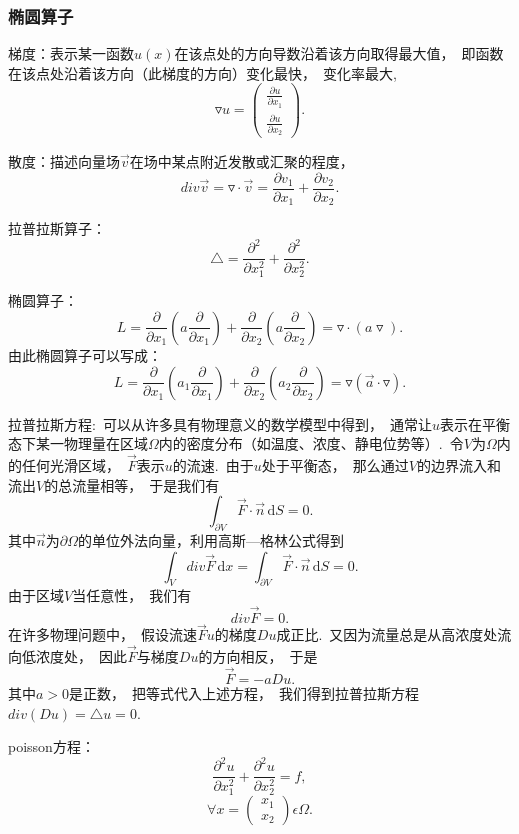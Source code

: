 \documentclass{article}
\begin{document}
\subsubsection{椭圆算子}
梯度：表示某一函数$u(x)$在该点处的方向导数沿着该方向取得最大值，~即函数在该点处沿着该方向（此梯度的方向）变化最快，~变化率最大,
$$\triangledown u=\begin{pmatrix}
 \frac{\partial u}{\partial x_1} \\
\frac{\partial u}{\partial x_2}
\end{pmatrix}.$$

散度：描述向量场$\vec{v}$在场中某点附近发散或汇聚的程度，
$$div\vec{v}=\triangledown \cdot \vec{v}=\dfrac{\partial v_1}{\partial x_1}+\dfrac{\partial v_2}{\partial x_2}.$$

拉普拉斯算子：
$$\triangle=\dfrac{\partial ^2}{\partial x_1^2}+\dfrac{\partial ^2}{\partial x_2^2}.$$

椭圆算子：
$$L=\dfrac{\partial}{\partial x_1}(a\dfrac{\partial}{\partial x_1})+\dfrac{\partial}{\partial x_2}(a\dfrac{\partial}{\partial x_2})=\triangledown \cdot (a\triangledown).$$
由此椭圆算子可以写成：
$$L=\dfrac{\partial}{\partial x_1}(a_1\dfrac{\partial}{\partial x_1})+\dfrac{\partial}{\partial x_2}(a_2\dfrac{\partial}{\partial x_2})=\triangledown (\vec a\cdot \triangledown).$$

拉普拉斯方程:~可以从许多具有物理意义的数学模型中得到，~通常让$u$表示在平衡态下某一物理量在区域$\Omega$内的密度分布（如温度、浓度、静电位势等）.~令$V$为$\Omega$内的任何光滑区域，~$\overrightarrow{F}$表示$u$的流速.~由于$u$处于平衡态，~那么通过$V$的边界流入和流出$V$的总流量相等，~于是我们有
$$\int_{\partial V} \overrightarrow{F}\cdot\overrightarrow{n} \, \mathrm{d}S =0.$$
其中$\overrightarrow{n}$为$\partial\Omega $的单位外法向量，利用高斯—格林公式得到
$$\int_{V} div\overrightarrow{F}\, \mathrm{d}x =\int_{\partial V} \overrightarrow{F}\cdot\overrightarrow{n} \, \mathrm{d}S =0.$$
由于区域$V$当任意性，~我们有
$$div\overrightarrow{F}=0.$$
在许多物理问题中，~假设流速$\overrightarrow{F}$$u$的梯度$Du$成正比.~又因为流量总是从高浓度处流向低浓度处，~因此$\overrightarrow{F}$与梯度$Du$的方向相反，~于是
$$\overrightarrow{F}=-aDu.$$
其中$a>0$是正数，~把等式代入上述方程，~我们得到拉普拉斯方程$div(Du)=\triangle u=0$.

poisson方程：
$$\dfrac{\partial ^2u}{\partial x_1^2}+\dfrac{\partial ^2u}{\partial x_2^2}=f,$$
$$\forall x=\begin{pmatrix}
x_1  \\
x_2
\end{pmatrix} \epsilon  \Omega.$$
\end{document}
